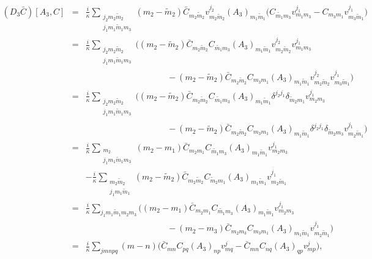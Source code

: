 \documentclass[a4paper,11pt]{article} %
\numberwithin{equation}{section} %
\numberwithin{figure}{section} %
\theoremstyle{plain} %
\theoremstyle{definition} %
\theoremstyle{remark} %
\begin{document}
\begin{eqnarray*}
 (D_3 \bar{C})[A_3,C] &=& \frac{i}{\kappa} \displaystyle\sum_{\substack{j_2 m_2 \tilde{m}_2 \\ j_1 m_1 \tilde{m}_1 m_3}}  ( m_2 - \tilde{m}_2 ) \bar{C}_{m_2 \tilde{m}_2} v^{j_2}_{m_2 \tilde{m}_2} (A_3)_{m_1 \tilde{m}_1} \Bigg( C_{\tilde{m_1} m_3} v^{j_1}_{m_1 m_3} - C_{m_3 m_1} v^{j_1}_{m_3 \tilde{m}_1} \Bigg) \\
                      &=& \frac{i}{\kappa} \displaystyle\sum_{\substack{j_2 m_2 \tilde{m}_2 \\ j_1 m_1 \tilde{m}_1 m_3}}  \Bigg( ( m_2 - \tilde{m}_2 ) \bar{C}_{m_2 \tilde{m}_2} C_{\tilde{m_1} m_3} (A_3)_{m_1 \tilde{m}_1} v^{j_2}_{m_2 \tilde{m}_2} v^{j_1}_{m_1 m_3} \\
                      && \hspace{4cm} - ( m_2 - \tilde{m}_2 ) \bar{C}_{m_2 \tilde{m}_2}  C_{m_3 m_1} (A_3)_{m_1 \tilde{m}_1} v^{j_2}_{m_2 \tilde{m}_2} v^{j_1}_{m_3 \tilde{m}_1} \Bigg) \\
                      &=& \frac{i}{\kappa} \displaystyle\sum_{\substack{j_2 m_2 \tilde{m}_2 \\ j_1 m_1 \tilde{m}_1 m_3}}  \Bigg( ( m_2 - \tilde{m}_2 ) \bar{C}_{m_2 \tilde{m}_2} C_{\tilde{m_1} m_3} (A_3)_{m_1 \tilde{m}_1} \delta^{j_2 j_1} \delta_{\tilde{m}_2 m_1} v^{j_1}_{m_2 m_3} \\
                      && \hspace{4cm} - ( m_2 - \tilde{m}_2 ) \bar{C}_{m_2 \tilde{m}_2}  C_{m_3 m_1} (A_3)_{m_1 \tilde{m}_1} \delta^{j_2 j_1} \delta_{\tilde{m}_2 m_3} v^{j_1}_{m_2 \tilde{m}_1} \Bigg) \\
                      &=& \frac{i}{\kappa} \displaystyle\sum_{\substack{m_2 \\ j_1 m_1 \tilde{m}_1 m_3}}  ( m_2 - m_1 ) \bar{C}_{m_2 m_1} C_{\tilde{m_1} m_3} (A_3)_{m_1 \tilde{m}_1} v^{j_1}_{m_2 m_3} \\
                      && - \frac{i}{\kappa} \displaystyle\sum_{\substack{m_2 \tilde{m}_2 \\ j_1 m_1 \tilde{m}_1 }} ( m_2 - \tilde{m}_2 ) \bar{C}_{m_2 \tilde{m}_2}  C_{\tilde{m}_2 m_1} (A_3)_{m_1 \tilde{m}_1} v^{j_1}_{m_2 \tilde{m}_1} \\
                      &=& \frac{i}{\kappa} \sum_{j_1 m_1 \tilde{m}_1 m_2 m_3} \Bigg(  ( m_2 - m_1 ) \bar{C}_{m_2 m_1} C_{\tilde{m_1} m_3} (A_3)_{m_1 \tilde{m}_1} v^{j_1}_{m_2 m_3} \\
                      && \hspace{4cm} -( m_2 - m_3 ) \bar{C}_{m_2 m_3}  C_{m_3 m_1} (A_3)_{m_1 \tilde{m}_1} v^{j_1}_{m_2 \tilde{m}_1} \Bigg) \\
                      &=& \frac{i}{\kappa} \sum_{j m n p q} ( m - n ) \Bigg( \bar{C}_{m n} C_{pq} (A_3)_{n p} v^{j}_{m q} - \bar{C}_{m n}  C_{n q} (A_3)_{q p} v^{j}_{m p} \Bigg),
\end{eqnarray*}
\end{document}
